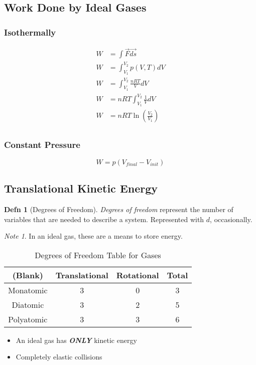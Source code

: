 \documentclass[10pt,letterpaper,final,twoside,notitlepage]{article}
\numberwithin{equation}{section} %
\theoremstyle{definition}
\newtheorem{definition}{Defn}
\theoremstyle{remark}
\newtheorem{note}{Note}
\begin{document}
	\subsection*{Work Done by Ideal Gases} \label{subsec:Work Done By Ideal Gas}
		\subsubsection*{Isothermally} \label{subsubsec:Work Done Isothermally}
			\begin{equation}
				\begin{aligned}
					W &= \int \vec{F} \vec{ds} \\
					W &= \int_{V_{1}}^{V_{2}} p \left( V,T \right) dV \\
					W &= \int_{V_{1}}^{V_{2}} \frac{nRT}{V} dV \\
					W &= nRT \int_{V_{1}}^{V_{2}} \frac{1}{V} dV \\
					W &= nRT \ln \left( \frac{V_{2}}{V_{1}} \right) \\
				\end{aligned}
			\end{equation}
		\subsubsection*{Constant Pressure} \label{subsubsec:Work Done Under Constant Pressure}
			\begin{equation}
				W = p \left(V_{final}-V_{init} \right)
			\end{equation}
			
	\subsection*{Translational Kinetic Energy} \label{subsec:Translational Kinetic Energy}
		\begin{definition}[Degrees of Freedom] \label{def:Degrees of Freedom}
			\emph{Degrees of freedom} represent the number of variables that are needed to describe a system. Represented with $d$, occasionally.
			\begin{note}
				In an ideal gas, these are a means to store energy.
			\end{note}
		\end{definition}
	
		\begin{table}[h!]
			\centering
			\begin{tabular}{c|c|c|c}
				(Blank) & Translational & Rotational & Total \\ \hline
				Monatomic & 3 & 0 & 3 \\ \hline
				Diatomic & 3 & 2 & 5 \\ \hline
				Polyatomic & 3 & 3 & 6 \\
			\end{tabular}
			\caption{Degrees of Freedom Table for Gases}
			\label{tab:Degrees of Freedom}
		\end{table}
		\begin{itemize}[noitemsep, nolistsep]
			\item An ideal gas has \emph{\textbf{ONLY}} kinetic energy
			\item Completely elastic collisions
		\end{itemize}
		
\end{document}
